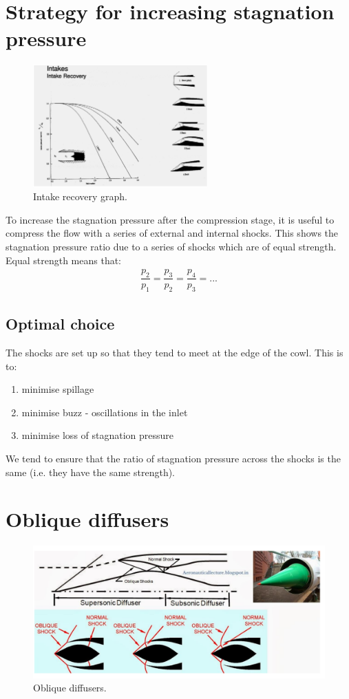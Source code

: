 \documentclass[class=report, crop=false, 12pt,a4paper]{standalone}
\begin{document}
\section{Strategy for increasing stagnation pressure}
\begin{figure}[H]
    \centering
    \includegraphics[width = 0.6\textwidth]{../img/diagram50.png}
    \caption{Intake recovery graph.}
\end{figure}
To increase the stagnation pressure after the compression stage, it is useful to compress the flow with a series of external and internal shocks. This shows the stagnation pressure ratio due to a series of shocks which are of equal strength. Equal strength means that:
\begin{gather}
    \dfrac{p_2}{p_1} = \dfrac{p_3}{p_2} = \dfrac{p_4}{p_3} = ...
\end{gather}
\subsection{Optimal choice}
The shocks are set up so that they tend to meet at the edge of the cowl. This is to:
\begin{enumerate}
    \item minimise spillage
    \item minimise buzz - oscillations in the inlet
    \item minimise loss of stagnation pressure
\end{enumerate}
We tend to ensure that the ratio of stagnation pressure across the shocks is the same (i.e. they have the same strength).
\section{Oblique diffusers}
\begin{figure}[H]
    \centering
    \includegraphics[width = \textwidth]{../img/diagram51.png}
    \caption{Oblique diffusers.}
\end{figure}
\end{document}
